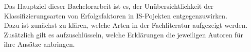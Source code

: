 Das Hauptziel dieser Bachelorarbeit ist es, der Unübersichtlichkeit der Klassifizierungsarten von Erfolgsfaktoren in IS-Pojekten entgegenzuwirken.\\
Dazu ist zunächst zu klären, welche Arten in der Fachliteratur aufgezeigt werden. Zu\-sätz\-lich gilt es aufzuschlüsseln, welche Erklärungen die
jeweiligen Autoren für ihre Ansätze anbringen.
